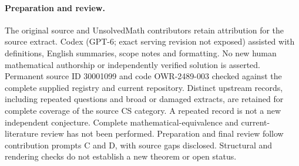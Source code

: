 \documentclass[11pt]{article}
\begin{document}
\paragraph{Preparation and review.}
The original source and UnsolvedMath contributors retain attribution for the source extract. Codex (GPT-6; exact serving revision not exposed) assisted with definitions, English summaries, scope notes and formatting. No new human mathematical authorship or independently verified solution is asserted. Permanent source ID 30001099 and code OWR-2489-003 checked against the complete supplied registry and current repository. Distinct upstream records, including repeated questions and broad or damaged extracts, are retained for complete coverage of the source CS category. A repeated record is not a new independent conjecture. Complete mathematical-equivalence and current-literature review has not been performed. Preparation and final review follow contribution prompts C and D, with source gaps disclosed. Structural and rendering checks do not establish a new theorem or open status.
\label{end:30001099}
\end{document}
